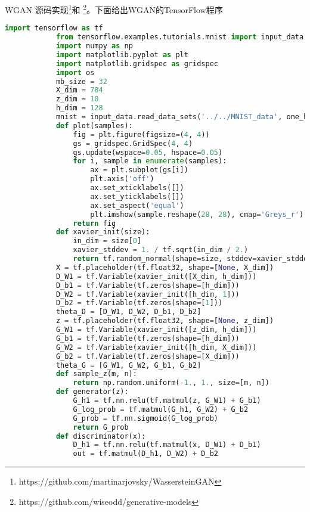             \par
            WGAN 源码实现\footnote{https://github.com/martinarjovsky/WassersteinGAN}和
            \footnote{https://github.com/wiseodd/generative-models}。下面给出WGAN的TensorFlow程序
            \begin{lstlisting}[language = Python]
            import tensorflow as tf
            from tensorflow.examples.tutorials.mnist import input_data
            import numpy as np
            import matplotlib.pyplot as plt
            import matplotlib.gridspec as gridspec
            import os
            mb_size = 32
            X_dim = 784
            z_dim = 10
            h_dim = 128
            mnist = input_data.read_data_sets('../../MNIST_data', one_hot=True)
            def plot(samples):
                fig = plt.figure(figsize=(4, 4))
                gs = gridspec.GridSpec(4, 4)
                gs.update(wspace=0.05, hspace=0.05)
                for i, sample in enumerate(samples):
                    ax = plt.subplot(gs[i])
                    plt.axis('off')
                    ax.set_xticklabels([])
                    ax.set_yticklabels([])
                    ax.set_aspect('equal')
                    plt.imshow(sample.reshape(28, 28), cmap='Greys_r')
                return fig
            def xavier_init(size):
                in_dim = size[0]
                xavier_stddev = 1. / tf.sqrt(in_dim / 2.)
                return tf.random_normal(shape=size, stddev=xavier_stddev)
            X = tf.placeholder(tf.float32, shape=[None, X_dim])
            D_W1 = tf.Variable(xavier_init([X_dim, h_dim]))
            D_b1 = tf.Variable(tf.zeros(shape=[h_dim]))
            D_W2 = tf.Variable(xavier_init([h_dim, 1]))
            D_b2 = tf.Variable(tf.zeros(shape=[1]))
            theta_D = [D_W1, D_W2, D_b1, D_b2]
            z = tf.placeholder(tf.float32, shape=[None, z_dim])
            G_W1 = tf.Variable(xavier_init([z_dim, h_dim]))
            G_b1 = tf.Variable(tf.zeros(shape=[h_dim]))
            G_W2 = tf.Variable(xavier_init([h_dim, X_dim]))
            G_b2 = tf.Variable(tf.zeros(shape=[X_dim]))
            theta_G = [G_W1, G_W2, G_b1, G_b2]
            def sample_z(m, n):
                return np.random.uniform(-1., 1., size=[m, n])
            def generator(z):
                G_h1 = tf.nn.relu(tf.matmul(z, G_W1) + G_b1)
                G_log_prob = tf.matmul(G_h1, G_W2) + G_b2
                G_prob = tf.nn.sigmoid(G_log_prob)
                return G_prob
            def discriminator(x):
                D_h1 = tf.nn.relu(tf.matmul(x, D_W1) + D_b1)
                out = tf.matmul(D_h1, D_W2) + D_b2

\end{lstlisting}
